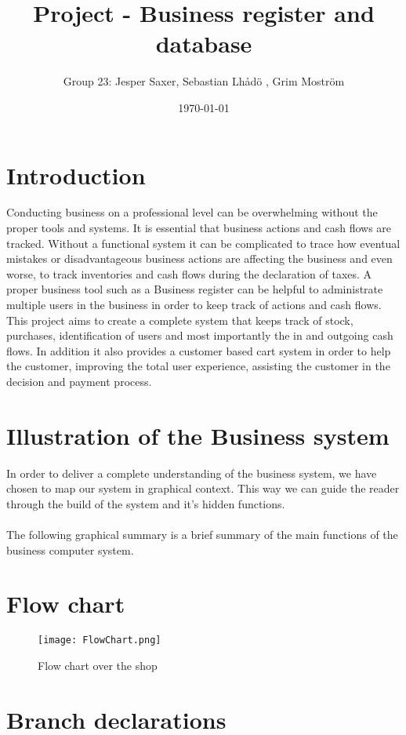 \documentclass[11pt]{article}
\begin{document}
\title{Project - Business register and database}
\author{Group 23: Jesper Saxer, Sebastian Lhådö , Grim Moström}
\date{\today}
\maketitle{}
\section{Introduction}
Conducting business on a professional level can be overwhelming without the proper tools and systems. It is essential that business actions and cash flows are tracked. Without  a functional system it can be complicated to trace how eventual mistakes or disadvantageous business actions are affecting the business and even worse, to track inventories and cash flows during the declaration of taxes. A proper business tool such as a Business register can be helpful to administrate multiple users in the business in order to keep track of actions and cash flows. This project aims to create a complete system that keeps track of stock, purchases, identification of users and most importantly the in and outgoing cash flows. In addition it also provides a customer based cart system in order to help the customer, improving the total user experience, assisting the customer in the decision and payment process.
\pagebreak
\tableofcontents
\pagebreak
\section{Illustration of the Business system}
In order to deliver a complete understanding of the business system, we have chosen to map our system in graphical context. This way we can guide the reader through the build of the system and it’s hidden functions.\\\\
The following graphical summary is a brief summary of the main functions of the business computer system.
\section{Flow chart}
\begin{figure}[h]
\texttt{[image: FlowChart.png]}
\caption{Flow chart over the shop}
\label{fig:flow chart}
\end{figure}
\section{Branch declarations}
\end{document}

